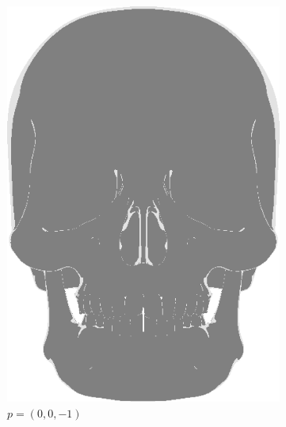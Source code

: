 \begin{figure}[h]
\centering
\begin{subfigure}[b]{0.25\textwidth}
        \includegraphics[width=\textwidth]{img/Lighting/Directional(0,-1).png}
        \caption{$p=(0,0,-1)$}
        \label{fig:LightingPosDir1}
\end{subfigure}
~
\hspace{24pt}
~
    \begin{subfigure}[b]{0.25\textwidth}

\end{subfigure}
\end{figure}
